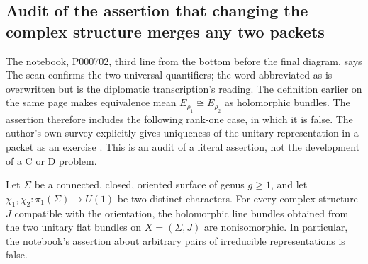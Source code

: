 \subsection{Audit of the assertion that changing the complex structure merges any two packets}

The notebook, P000702, third line from the bottom before the final diagram, says
The scan confirms the two universal quantifiers; the word abbreviated as
 is overwritten but is the diplomatic transcription's reading.
The definition earlier on the same page makes equivalence mean
\(E_{\rho_1}\cong E_{\rho_2}\) as holomorphic bundles.  The assertion therefore
includes the following rank-one case, in which it is false.  The author's own
survey explicitly gives uniqueness of the unitary representation in a packet
as an exercise \citep[Ch.~II, \S2, Exercise~10, p.~204]{tyurin1978periods}.
This is an audit
of a literal assertion, not the development of a C or D problem.

\begin{proposition}\ours{}
Let \(\Sigma\) be a connected, closed, oriented surface of genus \(g\geq1\),
and let \(\chi_1,\chi_2:\pi_1(\Sigma)\to U(1)\) be two distinct characters.
For every complex structure \(J\) compatible with the orientation, the
holomorphic line bundles obtained from the two unitary flat bundles on
\(X=(\Sigma,J)\) are nonisomorphic.  In particular, the notebook's assertion
about arbitrary pairs of irreducible representations is false.
\end{proposition}

